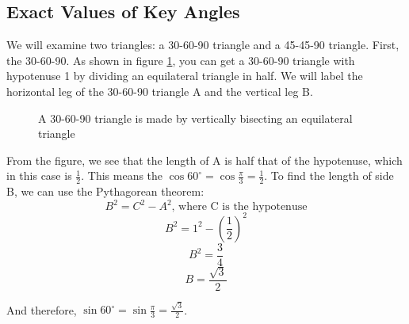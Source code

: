 \begin{Exercise}
\end{Exercise}

\subsection{Exact Values of Key Angles}
We will examine two triangles: a 30-60-90 triangle and a 45-45-90 triangle. 
First, the 30-60-90. As shown in figure \ref{fig:306090}, you can get a 
30-60-90 triangle with hypotenuse 1 by dividing an equilateral triangle in 
half. We will label the horizontal leg of the 30-60-90 triangle A and the 
vertical leg B. 

\begin{figure}[htbp]
    \centering
    \caption{A 30-60-90 triangle is made by vertically bisecting an equilateral
    triangle}
    \label{fig:306090}
\end{figure}

From the figure, we see that the length of A is half that of the hypotenuse, 
which in this case is $\frac{1}{2}$. This means the $\cos{60^{\circ}} = \cos{
\frac{\pi}{3}} = \frac{1}{2}$. To find the length of side B, we can use the 
Pythagorean theorem:
$$B^2 = C^2 - A^2\text{, where C is the hypotenuse}$$
$$B^2 = 1^2 - \left( \frac{1}{2} \right)^2$$
$$B^2 = \frac{3}{4}$$
$$B = \frac{\sqrt{3}}{2}$$

And therefore, $\sin{60^{\circ}} = \sin{\frac{\pi}{3}} = \frac{\sqrt{3}}{2}$. 

